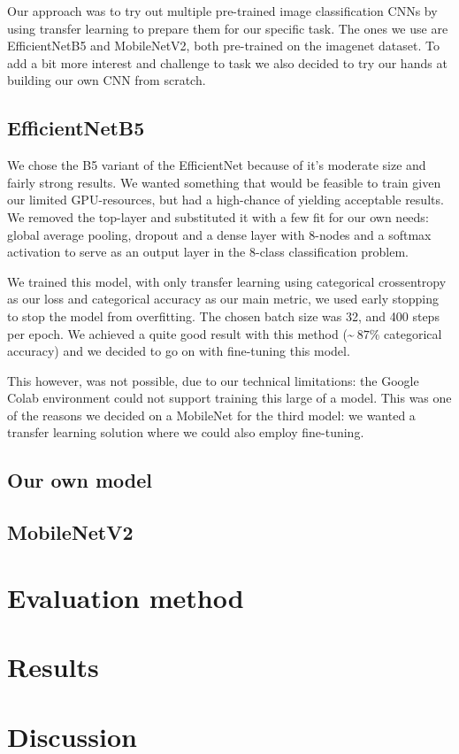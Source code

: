 \documentclass{article}
\begin{document}
	Our approach was to try out multiple pre-trained image classification CNNs by using transfer learning to prepare them for our specific task. The ones we use are EfficientNetB5 and MobileNetV2, both pre-trained on the imagenet dataset. To add a bit more interest and challenge to task we also decided to try our hands at building our own CNN from scratch.
	
	\subsection{EfficientNetB5}
	
	We chose the B5 variant of the EfficientNet because of it's moderate size and fairly strong results. We wanted something that would be feasible to train given our limited GPU-resources, but had a high-chance of yielding acceptable results. We removed the top-layer and substituted it with a few fit for our own needs: global average pooling, dropout and a dense layer with 8-nodes and a softmax activation to serve as an output layer in the 8-class classification problem.
	
	We trained this model, with only transfer learning using categorical crossentropy as our loss and categorical accuracy as our main metric, we used early stopping to stop the model from overfitting. The chosen batch size was 32, and 400 steps per epoch. We achieved a quite good result with this method (\textasciitilde$~87\% $ categorical accuracy) and we decided to go on with fine-tuning this model. 
	
	This however, was not possible, due to our technical limitations: the Google Colab environment could not support training this large of a model. This was one of the reasons we decided on a MobileNet for the third model: we wanted a transfer learning solution where we could also employ fine-tuning. 
	
	\subsection{Our own model}
	
	
	
	\subsection{MobileNetV2}
	
	
	
	\section{Evaluation method}
	
	\section{Results}
	
	\section{Discussion}
	
\end{document}
